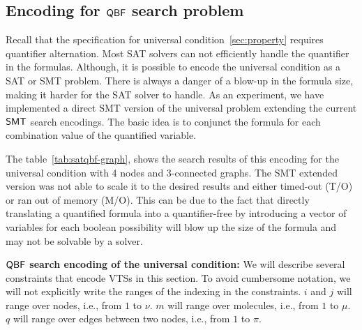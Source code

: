 \subsection{Encoding for $\mathsf{QBF}$ search problem}
\label{enc:univ-cond}
%
Recall that the specification for universal condition~\ref{sec:property} requires quantifier alternation. 
%
Most SAT solvers can not efficiently handle the quantifier in the formulas. 
% 
Although, it is possible to encode the universal condition as a SAT or SMT problem.
%
There is always a danger of a blow-up in the formula size, making it harder for the SAT solver to handle. 
% 
As an experiment, we have implemented a direct SMT version of the universal problem extending the current $\mathsf{SMT}$ search encodings.
%
The basic idea is to conjunct the formula for each combination value of the quantified variable. 
%
%

%
The table~\ref{tab:satqbf-graph}, shows the search results of this encoding for the universal condition with 4 nodes and 3-connected graphs. 
%
The SMT extended version was not able to scale it to the desired results and either timed-out (T/O) or ran out of memory (M/O).
%
This can be due to the fact that directly translating a quantified formula into a quantifier-free  by introducing a vector of variables for each boolean possibility will blow up the size of the formula and may not be solvable by a solver.
%

\textbf{$\mathsf{QBF}$ search encoding of the universal condition:}
We will describe several constraints that encode VTSs in this section.
%
To avoid cumbersome notation, we will not explicitly write the ranges
of the indexing in the constraints.
%
$i$ and $j$ will range over nodes, i.e., from $1$ to $\nu$.
%
$m$ will range over molecules, i.e., from $1$ to $\mu$.
%
$q$ will range over edges between two nodes, i.e., from $1$ to $\pi$.
%

